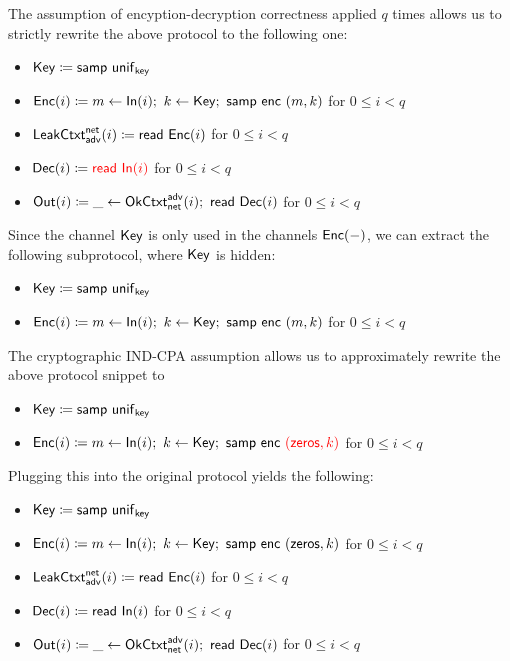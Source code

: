 \noindent The assumption of encyption-decryption correctness applied $q$ times allows us to strictly rewrite the above protocol to the following one:

\begin{itemize}
\item $\mathsf{Key} \coloneqq \mathsf{samp} \ \mathsf{unif}_{\mathsf{key}}$
\item $\mathsf{Enc}(i) \coloneqq m \leftarrow \mathsf{In}(i); \ k \leftarrow \mathsf{Key}; \ \mathsf{samp} \ \mathsf{enc} \ (m,k)$ for $0 \leq i < q$
\item $\mathsf{LeakCtxt}^{\mathsf{net}}_{\mathsf{adv}}(i) \coloneqq \mathsf{read} \ \mathsf{Enc}(i)$ for $0 \leq i < q$
\item $\mathsf{Dec}(i) \coloneqq {\color{red} \mathsf{read} \ \mathsf{In}(i)}$ for $0 \leq i < q$
\item $\mathsf{Out}(i) \coloneqq \_ \leftarrow \mathsf{OkCtxt}^{\mathsf{adv}}_{\mathsf{net}}(i); \ \mathsf{read} \ \mathsf{Dec}(i)$ for $0 \leq i < q$
\end{itemize}

\noindent Since the channel $\mathsf{Key}$ is only used in the channels $\mathsf{Enc}(-)$, we can extract the following subprotocol, where $\mathsf{Key}$ is hidden:

\begin{itemize}
\item $\mathsf{Key} \coloneqq \mathsf{samp} \ \mathsf{unif}_{\mathsf{key}}$
\item $\mathsf{Enc}(i) \coloneqq m \leftarrow \mathsf{In}(i); \ k \leftarrow \mathsf{Key}; \ \mathsf{samp} \ \mathsf{enc} \ (m,k)$ for $0 \leq i < q$
\end{itemize}

\noindent The cryptographic IND-CPA assumption allows us to approximately rewrite the above protocol snippet to

\begin{itemize}
\item $\mathsf{Key} \coloneqq \mathsf{samp} \ \mathsf{unif}_{\mathsf{key}}$
\item $\mathsf{Enc}(i) \coloneqq m \leftarrow \mathsf{In}(i); \ k \leftarrow \mathsf{Key}; \ \mathsf{samp} \ \mathsf{enc} \ {\color{red} (\mathsf{zeros},k)}$ for $0 \leq i < q$
\end{itemize}

\noindent Plugging this into the original protocol yields the following:

\begin{itemize}
\item $\mathsf{Key} \coloneqq \mathsf{samp} \ \mathsf{unif}_{\mathsf{key}}$
\item $\mathsf{Enc}(i) \coloneqq m \leftarrow \mathsf{In}(i); \ k \leftarrow \mathsf{Key}; \ \mathsf{samp} \ \mathsf{enc} \ (\mathsf{zeros},k)$ for $0 \leq i < q$
\item $\mathsf{LeakCtxt}^{\mathsf{net}}_{\mathsf{adv}}(i) \coloneqq \mathsf{read} \ \mathsf{Enc}(i)$ for $0 \leq i < q$
\item $\mathsf{Dec}(i) \coloneqq \mathsf{read} \ \mathsf{In}(i)$ for $0 \leq i < q$
\item $\mathsf{Out}(i) \coloneqq \_ \leftarrow \mathsf{OkCtxt}^{\mathsf{adv}}_{\mathsf{net}}(i); \ \mathsf{read} \ \mathsf{Dec}(i)$ for $0 \leq i < q$
\end{itemize}

